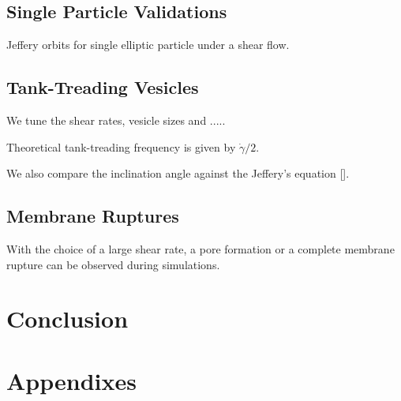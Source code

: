 \documentclass[%
 reprint,
 amsmath,amssymb,
 aps,
]{revtex4-2}
\begin{document}
\subsection{Single Particle Validations}

Jeffery orbits for single elliptic particle under a shear flow.




\subsection{Tank-Treading Vesicles}


We tune the shear rates, vesicle sizes and .....


Theoretical tank-treading frequency is given by $\dot\gamma/2$.


We also compare the inclination angle against the Jeffery's equation [].

\subsection{Membrane Ruptures}

With the choice of a large shear rate, a pore formation or a complete membrane rupture can be observed during simulations. 



\section{\label{conclusion}Conclusion}


\begin{acknowledgments}
\end{acknowledgments}

\appendix

\section{Appendixes}
\end{document}
